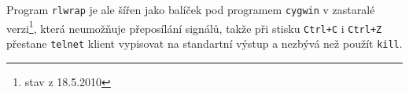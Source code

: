 Program \verb|rlwrap| je ale šířen jako balíček pod programem \verb|cygwin| v zastaralé verzi\footnote{stav z 18.5.2010}, která neumožňuje přeposílání signálů, takže při stisku \verb|Ctrl+C| i \verb|Ctrl+Z| přestane \verb|telnet| klient vypisovat na standartní výstup a nezbývá než použít \verb|kill|.











